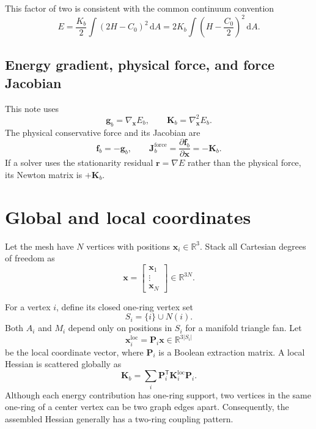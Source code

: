 \documentclass[11pt]{article}
\newcommand{\R}{\mathbb{R}}
\newcommand{\dd}{\mathrm{d}}
\newcommand{\T}{\mathsf{T}}
\newcommand{\grad}{\nabla}
\newcommand{\Hess}{\nabla^2}
\newcommand{\x}{\mathbf{x}}
\newcommand{\Kmat}{\mathbf{K}}
\newcommand{\Jmat}{\mathbf{J}}
\newcommand{\Pmat}{\mathbf{P}}
\begin{document}
This factor of two is consistent with the common continuum convention
\begin{equation}
  E=\frac{K_b}{2}\int(2H-C_0)^2\,\dd A
   =2K_b\int\left(H-\frac{C_0}{2}\right)^2\,\dd A.
\end{equation}

\subsection{Energy gradient, physical force, and force Jacobian}

This note uses
\begin{equation}
  \mathbf{g}_b = \grad_{\x}E_b,
  \qquad
  \Kmat_b = \Hess_{\x}E_b.
\end{equation}
The physical conservative force and its Jacobian are
\begin{equation}
  \boxed{
  \mathbf{f}_b=-\mathbf{g}_b,
  \qquad
  \Jmat_b^{\mathrm{force}}
  =\frac{\partial\mathbf{f}_b}{\partial\x}
  =-\Kmat_b.}
  \label{eq:force-sign}
\end{equation}
If a solver uses the stationarity residual $\mathbf{r}=\grad E$ rather than the physical force, its Newton matrix is $+\Kmat_b$.

\section{Global and local coordinates}

Let the mesh have $N$ vertices with positions $\mathbf{x}_i\in\R^3$.  Stack all Cartesian degrees of freedom as
\begin{equation}
  \x=
  \begin{bmatrix}
    \mathbf{x}_1\\ \vdots\\ \mathbf{x}_N
  \end{bmatrix}
  \in\R^{3N}.
\end{equation}

For a vertex $i$, define its closed one-ring vertex set
\begin{equation}
  S_i=\{i\}\cup N(i).
\end{equation}
Both $A_i$ and $M_i$ depend only on positions in $S_i$ for a manifold triangle fan.  Let
\begin{equation}
  \x_i^{\mathrm{loc}}=\Pmat_i\x\in\R^{3|S_i|}
\end{equation}
be the local coordinate vector, where $\Pmat_i$ is a Boolean extraction matrix.  A local Hessian is scattered globally as
\begin{equation}
  \Kmat_b
  =
  \sum_i \Pmat_i^\T\Kmat_i^{\mathrm{loc}}\Pmat_i.
  \label{eq:sparse-assembly}
\end{equation}
Although each energy contribution has one-ring support, two vertices in the same one-ring of a center vertex can be two graph edges apart.  Consequently, the assembled Hessian generally has a two-ring coupling pattern.
\end{document}
